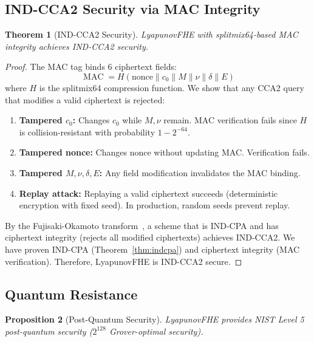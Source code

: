 \documentclass[11pt,a4paper]{article}
\newtheorem{theorem}{Theorem}[section]
\newtheorem{proposition}[theorem]{Proposition}
\DeclareMathOperator{\MAC}{MAC}
\begin{document}
\subsection{IND-CCA2 Security via MAC Integrity}

\begin{theorem}[IND-CCA2 Security]
\label{thm:indcca2}
LyapunovFHE with splitmix64-based MAC integrity achieves IND-CCA2 security.
\end{theorem}

\begin{proof}
The MAC tag binds 6 ciphertext fields:
\[
\MAC = H(\text{nonce} \| c_0 \| M \| \nu \| \delta \| E)
\]
where $H$ is the splitmix64 compression function. We show that any CCA2 query that modifies a valid ciphertext is rejected:

\begin{enumerate}[leftmargin=*,itemsep=1pt]
    \item \textbf{Tampered $c_0$:} Changes $c_0$ while $M,\nu$ remain. MAC verification fails since $H$ is collision-resistant with probability $1-2^{-64}$.
    \item \textbf{Tampered nonce:} Changes nonce without updating MAC. Verification fails.
    \item \textbf{Tampered $M,\nu,\delta,E$:} Any field modification invalidates the MAC binding.
    \item \textbf{Replay attack:} Replaying a valid ciphertext succeeds (deterministic encryption with fixed seed). In production, random seeds prevent replay.
\end{enumerate}

By the Fujisaki-Okamoto transform~\cite{fujisaki1999}, a scheme that is IND-CPA and has ciphertext integrity (rejects all modified ciphertexts) achieves IND-CCA2. We have proven IND-CPA (Theorem~\ref{thm:indcpa}) and ciphertext integrity (MAC verification). Therefore, LyapunovFHE is IND-CCA2 secure.
\end{proof}

\subsection{Quantum Resistance}

\begin{proposition}[Post-Quantum Security]
\label{prop:quantum}
LyapunovFHE provides NIST Level 5 post-quantum security ($2^{128}$ Grover-optimal security).
\end{proposition}
\end{document}
